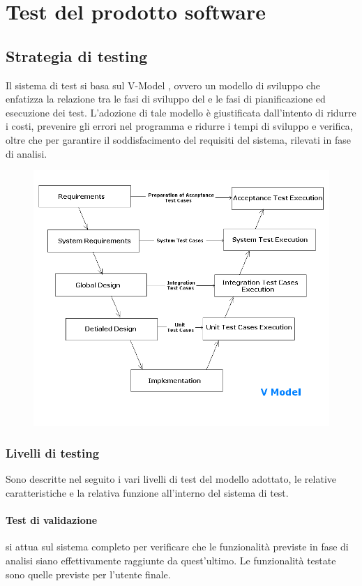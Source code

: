 \documentclass[12pt,a4paper]{article}
\begin{document}
\newpage

\section{Test del prodotto software}\label{test}

\subsection{Strategia di testing}\label{test_strategia}
Il sistema di test si basa sul V-Model , ovvero un modello di sviluppo che enfatizza la relazione tra le fasi di sviluppo del  e le fasi di pianificazione ed esecuzione dei test. L'adozione di tale modello è giustificata dall'intento di ridurre i costi, prevenire gli errori nel programma e ridurre i tempi di sviluppo e verifica, oltre che per garantire il soddisfacimento del requisiti del sistema, rilevati in fase di analisi.
\begin{figure}[h]
\centering
\includegraphics[width=0.9\linewidth]{../img/v-model}
\caption[V Model]{}
\label{fig:v-model}
\end{figure}

\subsubsection{Livelli di testing}
Sono descritte nel seguito i vari livelli di test del modello adottato, le relative caratteristiche e la relativa funzione all'interno del sistema di test. 
	\paragraph{Test di validazione} si attua sul sistema completo per verificare che le funzionalità previste in fase di analisi siano effettivamente raggiunte da quest'ultimo. Le funzionalità testate sono quelle previste per l'utente finale.
\end{document}
